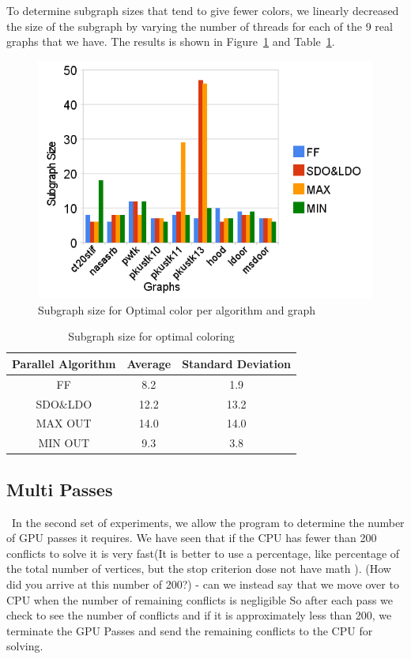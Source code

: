 \documentclass[preprint]{sigplanconf}
\begin{document}
To determine subgraph sizes that tend to give fewer colors, we linearly decreased the size of the subgraph by varying the number of threads for each of the 9 real graphs that we have. The results is shown in Figure~\ref{figureSubGraph} and Table~\ref{optimalColoringTable}.\\

\begin{figure}
  \centering
  \includegraphics[scale=0.5]{figures/subgraphSize.png}
  \caption{Subgraph size for Optimal color per algorithm and graph}
  \label{figureSubGraph}
\end{figure}



\begin{table}
\scriptsize
\begin{center}
\begin{tabular}{c c c}
\hline
Parallel Algorithm  & Average  & Standard Deviation \\
\hline
FF & 8.2 & 1.9 \\
SDO$\&$LDO & 12.2 & 13.2 \\
MAX OUT & 14.0 & 14.0 \\
MIN OUT & 9.3 & 3.8 \\
\end{tabular}
\caption{Subgraph size for optimal coloring}
\label{optimalColoringTable}
\end{center}
\end{table}



\subsection{Multi Passes}\
In the second set of experiments, we allow the program to determine the number of GPU passes it requires. We have seen that if the CPU has fewer than 200 conflicts to solve it is very fast(It is better to use a percentage, like percentage of the total number of vertices, but the stop criterion dose not have math ). (How did you arrive at this number of 200?)  - can we instead say that we move over to CPU when the number of remaining conflicts is negligible So after each pass we check to see the number of conflicts and if it is approximately less than 200, we terminate the GPU Passes and send the remaining conflicts to the CPU for solving.\
\end{document}
